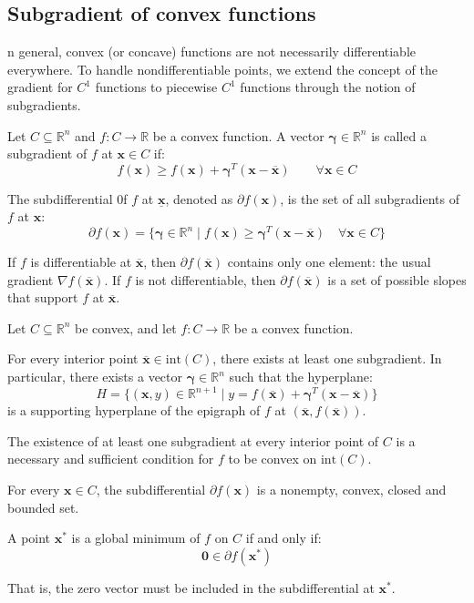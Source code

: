 \subsection{Subgradient of convex functions}
n general, convex (or concave) functions are not necessarily differentiable everywhere.
To handle nondifferentiable points, we extend the concept of the gradient for $C^1$ functions to piecewise $C^1$ functions through the notion of subgradients.

\begin{definition}
    Let $C \subseteq\mathbb{R}^n$ and $f : C \rightarrow\mathbb{R}$ be a convex function.
    A vector $\boldsymbol{\gamma}\in \mathbb{R}^n$  is called a subgradient of $f$ at $\mathbf{x}\in C$ if:
    \[f (\mathbf{x}) \geq f (\mathbf{x}) + \boldsymbol{\gamma}^T (\mathbf{x}-\overline{\mathbf{x}}) \qquad \forall \mathbf{x} \in C \]
\end{definition}
\begin{definition}
    The subdifferential 0f $f$ at $\underline{\mathbf{x}}$, denoted as $\partial f (\mathbf{x})$, is the set of all subgradients of $f$ at $\mathbf{x}$: 
    \[\partial f(\mathbf{x})=\{\boldsymbol{\gamma}\in\mathbb{R}^n\mid f(\mathbf{x})\geq \boldsymbol{\gamma}^T(\mathbf{x}-\overline{\mathbf{x}}) \quad\forall\mathbf{x}\in C\}\]
\end{definition}
\noindent If $f$ is differentiable at $\overline{\mathbf{x}}$, then $\partial f(\overline{\mathbf{x}})$ contains only one element: the usual gradient $\nabla f(\overline{\mathbf{x}})$. 
If $f$ is not differentiable, then $\partial f(\overline{\mathbf{x}})$ is a set of possible slopes that support $f$ at $\overline{\mathbf{x}}$. 

Let $C \subseteq\mathbb{R}^n$ be convex, and let $f : C \rightarrow\mathbb{R}$ be a convex function.
\begin{property}
    For every interior point $\overline{\mathbf{x}}\in\text{int}(C)$, there exists at least one subgradient.
    In particular, there exists a vector $\boldsymbol{\gamma}\in\mathbb{R}^n$ such that the hyperplane:
    \[H= \{(\mathbf{x},y) \in\mathbb{R}^{n+1} \mid y = f (\overline{\mathbf{x}}) + \boldsymbol{\gamma}^T (\mathbf{x}-\overline{\mathbf{x}})\}\]
    is a supporting hyperplane of the epigraph of $f$ at $(\overline{\mathbf{x}},f (\overline{\mathbf{x}}))$.
\end{property}
\noindent The existence of at least one subgradient at every interior point of $C$  is a necessary and sufficient condition for $f$ to be convex on $\text{int}(C)$.
\begin{property}
    For every $\mathbf{x} \in C$, the subdifferential $\partial f (\mathbf{x})$ is a nonempty, convex, closed and bounded set.
\end{property}
\begin{property}
    A point $\mathbf{x}^\ast$ is a global minimum of $f$ on $C$ if and only if: 
    \[\mathbf{0} \in\partial f (\mathbf{x}^\ast)\]
\end{property}
\noindent That is, the zero vector must be included in the subdifferential at $\mathbf{x}^\ast$.